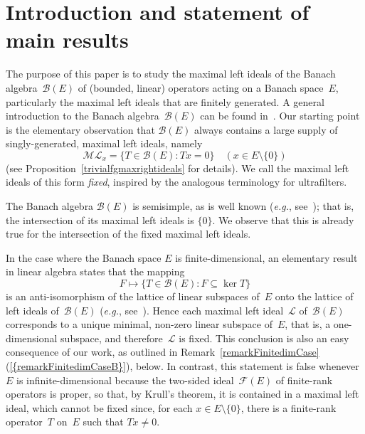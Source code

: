 \documentclass[12pt]{amsart}
\theoremstyle{definition}
\numberwithin{equation}{section}
\begin{document}
\section{Introduction and statement of main results}
\noindent
The purpose of this paper is to study the maximal left ideals of the
Banach algebra~$\mathscr{B}(E)$ of (bounded, linear) operators acting
on a Banach space~$E$, particularly the maximal left ideals that are
finitely generated. A general introduction to the Banach
algebra~$\mathscr{B}(E)$ can be found in~\cite[\S2.5]{dales}. Our
starting point is the elementary observation that $\mathscr{B}(E)$
always contains a large supply of singly-generated, maximal left
ideals, namely
\begin{equation}\label{trivialfgmaxrightidealsEq}
  \mathscr{M}\!\mathscr{L}_x = \{ T\in\mathscr{B}(E) : Tx =
  0\}\quad (x\in E\setminus\{0\}) \end{equation} (see
Proposition~\ref{trivialfgmaxrightideals} for details).  We call the
maximal left ideals of this form \emph{fixed}, inspired by the
analogous terminology for ultrafilters.

The Banach algebra $\mathscr{B}(E)$ is semi\-simple, as is well known
(\emph{e.g.}, see~\cite[Theorem~2.5.8]{dales}); that is, the
intersection of its maximal left ideals is $\{0\}$. We observe that
this is already true for the inter\-section of the fixed maximal left
ideals.

In the case where the Banach space $E$ is finite-dimensional, an
elementary result in linear algebra states that the mapping
\[ F\mapsto \{T\in\mathscr{B}(E) : F\subseteq\ker T\} \] is an
anti-isomorphism of the lattice of linear subspaces of~$E$ onto the
lattice of left ideals of~$\mathscr{B}(E)$ (\emph{e.g.},
see~\cite[p.~173, Exercise~3]{jacobson}). Hence each maximal left
ideal~$\mathscr{L}$ of~$\mathscr{B}(E)$ corresponds to a unique
minimal, non-zero linear subspace of~$E$, that is, a one-dimensional
subspace, and therefore~$\mathscr{L}$ is fixed. This conclusion is
also an easy consequence of our work, as outlined in
Remark~\ref{remarkFinitedimCase}{{\normalfont\textrm{(\ref{{remarkFinitedimCaseB}})}}},
below. In contrast, this statement is false whenever~$E$ is
infinite-dimensional because the two-sided ideal~$\mathscr{F}(E)$ of
finite-rank operators is proper, so that, by Krull's theorem, it is
contained in a maximal left ideal, which cannot be fixed since, for
each $x\in E\setminus\{0\}$, there is a finite-rank operator~$T$
on~$E$ such that $Tx\neq 0$.
\end{document}
